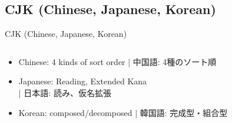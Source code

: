 \documentclass[aspectratio=169,10pt]{beamer}
\begin{document}
\subsection{CJK (Chinese, Japanese, Korean)}
\begin{frame}{CJK (Chinese, Japanese, Korean)}
\begin{columns}
\begin{column}{120mm}
\begin{center}
\large
  \begin{itemize}
    \item Chinese: 4 kinds of sort order | 中国語: 4種のソート順
    \item Japanese: Reading, Extended Kana\\
          \hspace{57mm} | 日本語: 読み、仮名拡張
    \item Korean: composed/decomposed | 韓国語: 完成型・組合型
  \end{itemize}
\end{center}
\end{column}
\end{columns}
\end{frame}

\end{document}
